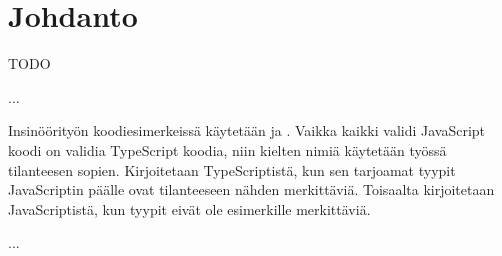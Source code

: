 
\chapter{Johdanto}

TODO

...

Insinöörityön koodiesimerkeissä käytetään  ja . Vaikka kaikki validi JavaScript koodi on validia TypeScript koodia, niin kielten nimiä käytetään työssä tilanteesen sopien. Kirjoitetaan TypeScriptistä, kun sen tarjoamat tyypit JavaScriptin päälle ovat tilanteeseen nähden merkittäviä. Toisaalta kirjoitetaan JavaScriptistä, kun tyypit eivät ole esimerkille merkittäviä.

...